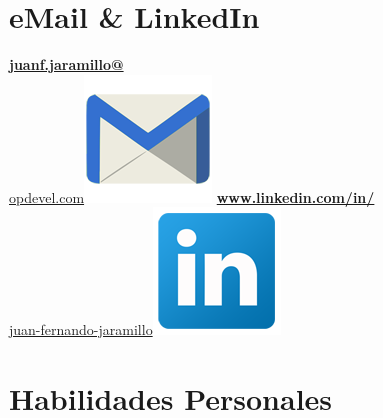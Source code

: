 \begin{aside}
    \section{eMail \& LinkedIn}
    \href{mailto:juanf.jaramillo@opdevel.com}{\small{\textbf{juanf.jaramillo@}\\opdevel.com}\includegraphics[scale=0.07]{img/email2.png}}
    \href{https://www.linkedin.com/in/juan-fernando-jaramillo/}{\textbf{www.linkedin.com/in/}\small{\\juan-fernando-jaramillo}\includegraphics[scale=0.07]{img/Linkedin.png}}
   ~
   ~
   ~
   ~
   ~
   ~
   ~
   ~
 \section{Habilidades Personales}
\end{aside}
